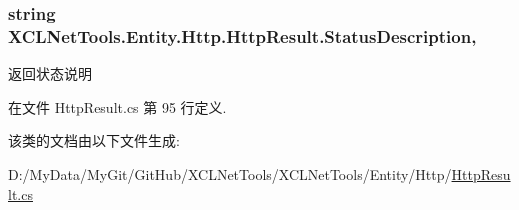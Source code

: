 \hypertarget{class_x_c_l_net_tools_1_1_entity_1_1_http_1_1_http_result_ae52de9f66b0248b366ee38cc9eae5659}{
\subsubsection[{Status\-Description}]{\setlength{\rightskip}{0pt plus 5cm}string X\-C\-L\-Net\-Tools.\-Entity.\-Http.\-Http\-Result.\-Status\-Description\hspace{0.3cm}{\ttfamily [get]}, {\ttfamily [set]}}}\label{class_x_c_l_net_tools_1_1_entity_1_1_http_1_1_http_result_ae52de9f66b0248b366ee38cc9eae5659}


返回状态说明 



在文件 Http\-Result.\-cs 第 95 行定义.



该类的文档由以下文件生成\-:\begin{DoxyCompactItemize}
\item 
D\-:/\-My\-Data/\-My\-Git/\-Git\-Hub/\-X\-C\-L\-Net\-Tools/\-X\-C\-L\-Net\-Tools/\-Entity/\-Http/\hyperlink{_http_result_8cs}{Http\-Result.\-cs}\end{DoxyCompactItemize}
